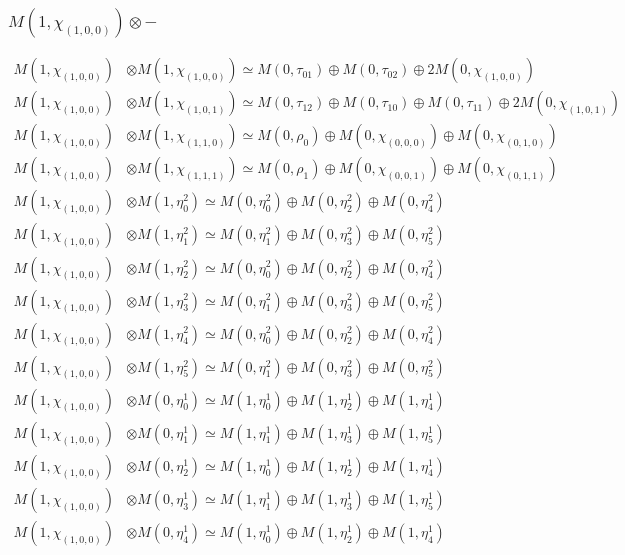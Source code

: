 \subsubsection{$ M(1,\chi_{(1,0,0)})\otimes -$}
\begin{align*}
M(1,\chi_{(1,0,0)}) &\otimes M(1,\chi_{(1,0,0)}) \simeq M(0,\tau_{01}) \oplus M(0,\tau_{02}) \oplus 2 M(0,\chi_{(1,0,0)}) \\
M(1,\chi_{(1,0,0)}) &\otimes M(1,\chi_{(1,0,1)}) \simeq M(0,\tau_{12}) \oplus M(0,\tau_{10}) \oplus M(0,\tau_{11}) \oplus 2 M(0,\chi_{(1,0,1)}) \\
M(1,\chi_{(1,0,0)}) &\otimes M(1,\chi_{(1,1,0)}) \simeq M(0,\rho_{0}) \oplus M(0,\chi_{(0,0,0)}) \oplus M(0,\chi_{(0,1,0)}) \\
M(1,\chi_{(1,0,0)}) &\otimes M(1,\chi_{(1,1,1)}) \simeq M(0,\rho_{1}) \oplus M(0,\chi_{(0,0,1)}) \oplus M(0,\chi_{(0,1,1)}) \\
M(1,\chi_{(1,0,0)}) &\otimes M(1,\eta^{2}_{0}) \simeq M(0,\eta^{2}_{0}) \oplus M(0,\eta^{2}_{2}) \oplus M(0,\eta^{2}_{4}) \\
M(1,\chi_{(1,0,0)}) &\otimes M(1,\eta^{2}_{1}) \simeq M(0,\eta^{2}_{1}) \oplus M(0,\eta^{2}_{3}) \oplus M(0,\eta^{2}_{5}) \\
M(1,\chi_{(1,0,0)}) &\otimes M(1,\eta^{2}_{2}) \simeq M(0,\eta^{2}_{0}) \oplus M(0,\eta^{2}_{2}) \oplus M(0,\eta^{2}_{4}) \\
M(1,\chi_{(1,0,0)}) &\otimes M(1,\eta^{2}_{3}) \simeq M(0,\eta^{2}_{1}) \oplus M(0,\eta^{2}_{3}) \oplus M(0,\eta^{2}_{5}) \\
M(1,\chi_{(1,0,0)}) &\otimes M(1,\eta^{2}_{4}) \simeq M(0,\eta^{2}_{0}) \oplus M(0,\eta^{2}_{2}) \oplus M(0,\eta^{2}_{4}) \\
M(1,\chi_{(1,0,0)}) &\otimes M(1,\eta^{2}_{5}) \simeq M(0,\eta^{2}_{1}) \oplus M(0,\eta^{2}_{3}) \oplus M(0,\eta^{2}_{5}) \\
M(1,\chi_{(1,0,0)}) &\otimes M(0,\eta^{1}_{0}) \simeq M(1,\eta^{1}_{0}) \oplus M(1,\eta^{1}_{2}) \oplus M(1,\eta^{1}_{4}) \\
M(1,\chi_{(1,0,0)}) &\otimes M(0,\eta^{1}_{1}) \simeq M(1,\eta^{1}_{1}) \oplus M(1,\eta^{1}_{3}) \oplus M(1,\eta^{1}_{5}) \\
M(1,\chi_{(1,0,0)}) &\otimes M(0,\eta^{1}_{2}) \simeq M(1,\eta^{1}_{0}) \oplus M(1,\eta^{1}_{2}) \oplus M(1,\eta^{1}_{4}) \\
M(1,\chi_{(1,0,0)}) &\otimes M(0,\eta^{1}_{3}) \simeq M(1,\eta^{1}_{1}) \oplus M(1,\eta^{1}_{3}) \oplus M(1,\eta^{1}_{5}) \\
M(1,\chi_{(1,0,0)}) &\otimes M(0,\eta^{1}_{4}) \simeq M(1,\eta^{1}_{0}) \oplus M(1,\eta^{1}_{2}) \oplus M(1,\eta^{1}_{4}) \\

\end{align*}
